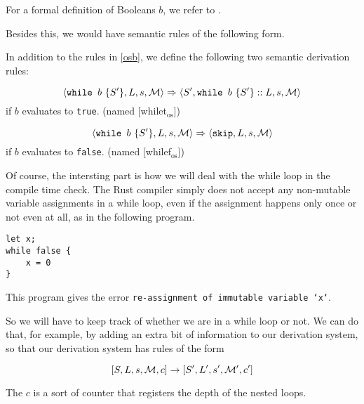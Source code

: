 For a formal definition of Booleans $b$, we refer to \cite{nielson1992semantics}.

Besides this, we would have semantic rules of the following form. 

\begin{definition}
\label{oswhile}
In addition to the rules in \ref{osb}, we define the following two semantic derivation rules:

$$\langle \texttt{while } b~ \{ S' \}, L, s, \mathcal{M} \rangle \Rightarrow \langle S', \texttt{while } b~ \{ S' \}::L, s, \mathcal{M} \rangle$$ 
if $b$ evaluates to \texttt{true}. (named [whilet$_{\textrm{os}}$])

$$\langle \texttt{while } b~ \{ S' \}, L, s, \mathcal{M} \rangle \Rightarrow \langle \texttt{skip}, L, s, \mathcal{M} \rangle$$ 
if $b$ evaluates to \texttt{false}. (named [whilef$_{\textrm{os}}$])
\end{definition}

Of course, the intersting part is how we will deal with the while loop in the compile time check. The Rust compiler simply does not accept any non-mutable variable assignments in a while loop, even if the assignment happens only once or not even at all, as in the following program.

\begin{verbatim}
let x;
while false {
    x = 0
}
\end{verbatim}

This program gives the error \texttt{re-assignment of immutable variable `x`}.

So we will have to keep track of whether we are in a while loop or not. We can do that, for example, by adding an extra bit of information to our derivation system, so that our derivation system has rules of the form 

$$[ S, L, s, \mathcal{M}, c ] \to [ S', L', s', \mathcal{M'}, c' ]$$

The $c$ is a sort of counter that registers the depth of the nested loops. 

